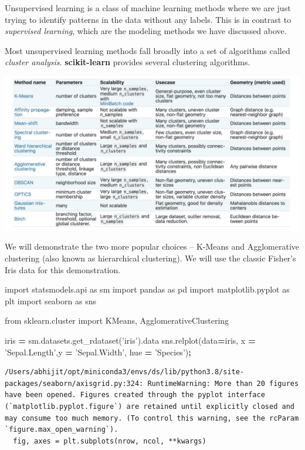 \documentclass[
  letterpaper,
]{scrbook}
\newenvironment{Shaded}{\begin{snugshade}}{\end{snugshade}}
\newcommand{\ImportTok}[1]{#1}
\newcommand{\NormalTok}[1]{#1}
\newcommand{\OperatorTok}[1]{\textcolor[rgb]{0.81,0.36,0.00}{\textbf{#1}}}
\newcommand{\StringTok}[1]{\textcolor[rgb]{0.31,0.60,0.02}{#1}}
\begin{document}
Unsupervised learning is a class of machine learning methods where we are just trying to identify patterns in the data without any labels. This is in contrast to \emph{supervised learning}, which are the modeling methods we have discussed above.

Most unsupervised learning methods fall broadly into a set of algorithms called \emph{cluster analysis}. \textbf{scikit-learn} provides several clustering algorithms.

\includegraphics{graphs/cluster_choice.png}

We will demonstrate the two more popular choices -- K-Means and Agglomerative clustering (also known as hierarchical clustering). We will use the classic Fisher's Iris data for this demonstration.

\begin{Shaded}
\begin{Highlighting}[]
\ImportTok{import}\NormalTok{ statsmodels.api }\ImportTok{as}\NormalTok{ sm}
\ImportTok{import}\NormalTok{ pandas }\ImportTok{as}\NormalTok{ pd}
\ImportTok{import}\NormalTok{ matplotlib.pyplot }\ImportTok{as}\NormalTok{ plt}
\ImportTok{import}\NormalTok{ seaborn }\ImportTok{as}\NormalTok{ sns}

\ImportTok{from}\NormalTok{ sklearn.cluster }\ImportTok{import}\NormalTok{ KMeans, AgglomerativeClustering}

\NormalTok{iris }\OperatorTok{=}\NormalTok{ sm.datasets.get_rdataset(}\StringTok{'iris'}\NormalTok{).data}
\NormalTok{sns.relplot(data}\OperatorTok{=}\NormalTok{iris, x }\OperatorTok{=} \StringTok{'Sepal.Length'}\NormalTok{,y }\OperatorTok{=} \StringTok{'Sepal.Width'}\NormalTok{, hue }\OperatorTok{=} \StringTok{'Species'}\NormalTok{)}\OperatorTok{;}
\end{Highlighting}
\end{Shaded}

\begin{verbatim}
/Users/abhijit/opt/miniconda3/envs/ds/lib/python3.8/site-packages/seaborn/axisgrid.py:324: RuntimeWarning: More than 20 figures have been opened. Figures created through the pyplot interface (`matplotlib.pyplot.figure`) are retained until explicitly closed and may consume too much memory. (To control this warning, see the rcParam `figure.max_open_warning`).
  fig, axes = plt.subplots(nrow, ncol, **kwargs)
\end{verbatim}
\end{document}
